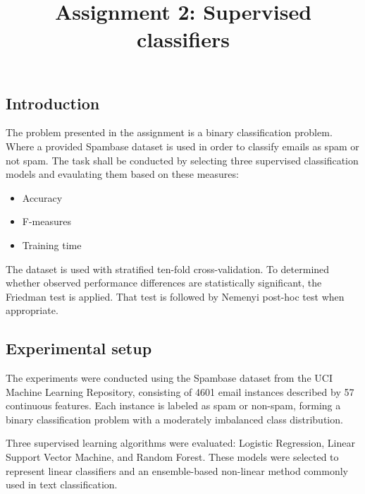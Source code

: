\documentclass[conference]{IEEEtran}
\begin{document}
\title{Assignment 2: Supervised classifiers}

\author{
}

\maketitle


\subsection{Introduction}
The problem presented in the assignment is a binary classification problem. Where a provided Spambase dataset is used in order
to classify emails as spam or not spam. The task shall be conducted by selecting three supervised classification models and evaulating them
based on these measures: 
\begin{itemize}
    \item Accuracy
    \item F-measures
    \item Training time 
\end{itemize}

The dataset is used with stratified ten-fold cross-validation. To determined whether observed performance
differences are statistically significant, the Friedman test is applied. That test is followed by Nemenyi post-hoc test when 
appropriate. 

 \subsection{Experimental setup}

The experiments were conducted using the Spambase dataset from the UCI Machine Learning Repository, consisting of 4601 email instances described by 57 continuous features. Each instance is labeled as spam or non-spam, forming a binary classification problem with a moderately imbalanced class distribution.

Three supervised learning algorithms were evaluated: Logistic Regression, Linear Support Vector Machine, and Random Forest. These models were selected to represent linear classifiers and an ensemble-based non-linear method commonly used in text classification.
\end{document}
